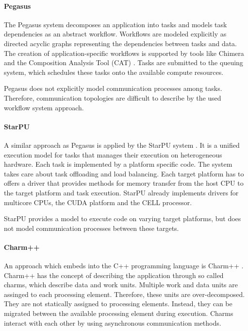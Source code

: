 \paragraph*{Pegasus}
The Pegasus system \cite{ref:pegasus} decomposes an application into
tasks and models task dependencies as an abstract workflow. Workflows
are modeled explicitly as directed acyclic graphs representing the
dependencies between tasks and data. The creation of
application-specific workflows is supported by tools like Chimera
\cite{ref:chimera} and the Composition Analysis Tool (CAT)
\cite{ref:cat}.  Tasks are submitted to the queuing system, which
schedules these tasks onto the available compute resources.

Pegasus does not explicitly model communication processes among tasks.
Therefore, communication topologies are difficult to describe by the
used workflow system approach.


\paragraph*{StarPU} 
A similar approach as Pegasus is applied by the StarPU system
\cite{ref:starpu}.  It is a unified execution model for tasks that
manages their execution on heterogeneous hardware.  Each task is
implemented by a platform specific code. The system takes care about
task offloading and load balancing. Each target platform has to offers
a driver that provides methods for memory transfer from the host CPU
to the target platform and task execution. StarPU already implements
drivers for multicore CPUs, the CUDA platform and the CELL processor.

StarPU provides a model to execute code on varying target platforms,
but does not model communication processes between these targets.

\paragraph*{Charm++} 
An approach which embeds into the C++ programming language is Charm++
\cite{ref:charm}. Charm++ has the concept of describing the
application through so called charms, which describe data and work
units. Multiple work and data units are assinged to each processing
element. Therefore, these units are over-decomposed.  They are not
statically assigned to processing elements. Instead, they can be
migrated between the available processing element during
execution. Charms interact with each other by using asynchronous
communication methods.


